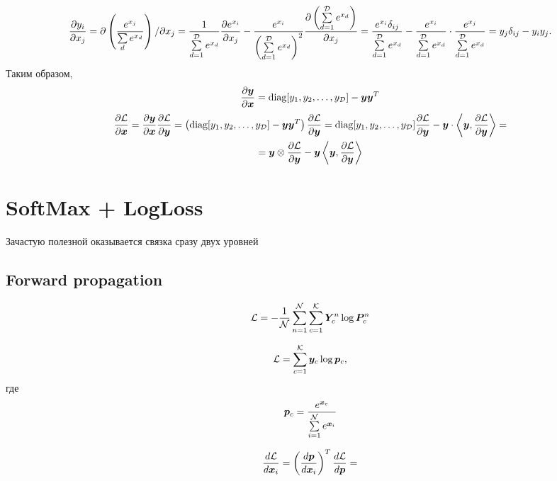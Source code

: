 \documentclass{report}
\numberwithin{theorem}{chapter}
\numberwithin{statement}{chapter}
\numberwithin{lemma}{chapter}
\theoremstyle{definition}
\numberwithin{task}{chapter}
\theoremstyle{remark}
\numberwithin{example}{chapter}
\theoremstyle{definition}
\numberwithin{definition}{chapter}
\theoremstyle{remark}
\theoremstyle{remark}
\numberwithin{lyrics}{section}
\begin{document}
\begin{gather*}
\frac{\partial y_i }{\partial x_j} = \partial \left(\frac{e^{x_j}}{\sum\limits_d e^{x_d}}\right) / \partial x_j = \frac{1}{\sum\limits_{d=1}^{\mathcal{D}} e^{x_d}} \frac{\partial e^{x_i} }{\partial x_j} - \frac{e^{x_i}}{\left(\sum\limits_{d=1}^{\mathcal{D}} e^{x_d}\right)^2} \frac{\partial \left(\sum\limits_{d=1}^{\mathcal{D}} e^{x_d}\right) }{\partial x_j} = \frac{e^{x_i}\delta_{ij}}{\sum\limits_{d=1}^{\mathcal{D}} e^{x_d}} - \frac{e^{x_i}}{\sum\limits_{d=1}^{\mathcal{D}} e^{x_d}} \cdot \frac{e^{x_j}}{\sum\limits_{d=1}^{\mathcal{D}} e^{x_d}} = y_j \delta_{ij} - y_i y_j.
\end{gather*}
Таким образом,
\begin{gather*}
\frac{\partial \boldsymbol{y} }{\partial \boldsymbol{x}} = \text{diag}[y_1, y_2, \dots, y_{\mathcal{D}}] - \boldsymbol{y} \boldsymbol{y}^T
\end{gather*}
\begin{gather*}
\frac{\partial \mathcal{L} }{\partial \boldsymbol{x}} = \frac{\partial \boldsymbol{y} }{\partial \boldsymbol{x}} \frac{\partial \mathcal{L} }{\partial \boldsymbol{y}} = \left(\text{diag}[y_1, y_2, \dots, y_{\mathcal{D}}] - \boldsymbol{y} \boldsymbol{y}^T\right) \frac{\partial \mathcal{L} }{\partial \boldsymbol{y}} = \text{diag}[y_1, y_2, \dots, y_{\mathcal{D}}] \frac{\partial \mathcal{L} }{\partial \boldsymbol{y}} - \boldsymbol{y} \cdot \left\langle \boldsymbol{y}, \frac{\partial \mathcal{L} }{\partial \boldsymbol{y}} \right\rangle = \\
= \boldsymbol{y} \otimes \frac{\partial \mathcal{L} }{\partial \boldsymbol{y}} - \boldsymbol{y} \left\langle \boldsymbol{y}, \frac{\partial \mathcal{L} }{\partial \boldsymbol{y}} \right\rangle
\end{gather*}

\section{SoftMax + LogLoss}
Зачастую полезной оказывается связка сразу двух уровней

\subsection{Forward propagation}

$$
\mathcal{L} = - \frac{1}{\mathcal{N}} \sum\limits_{n=1}^{\mathcal{N}} \sum\limits_{c=1}^{\mathcal{K}} \boldsymbol{Y}_c^n \log \boldsymbol{P}_c^n
$$


$$
\mathcal{L} = \sum\limits_{c=1}^{\mathcal{K}} \boldsymbol{y}_c \log \boldsymbol{p}_c,
$$
где 
$$
\boldsymbol{p}_c = \frac{e^{\boldsymbol{x}_c}}{\sum\limits_{i=1}^{\mathcal{N}} e^{\boldsymbol{x}_i}}
$$


\begin{gather*}
\frac{d\mathcal{L}}{d \boldsymbol{x}_i} = \left(\frac{d \boldsymbol{p}}{d \boldsymbol{x}_i}\right)^T \frac{d \mathcal{L}}{d \boldsymbol{p}} = 
\end{gather*}
\end{document}
